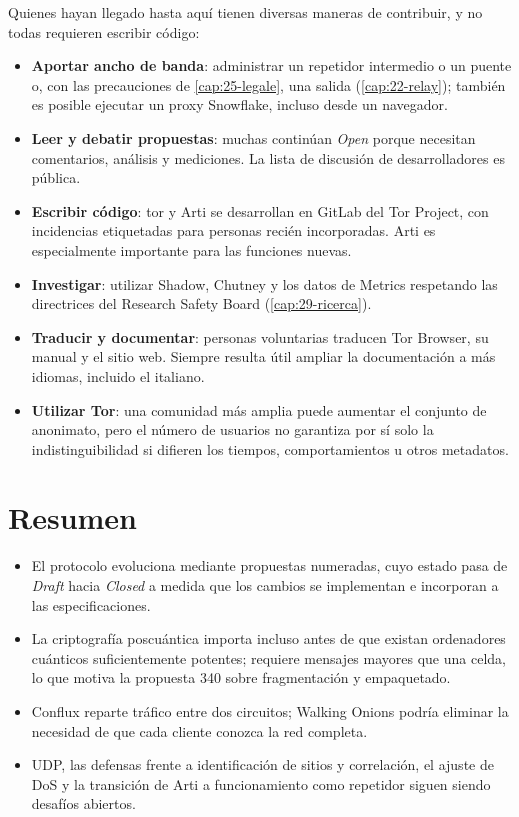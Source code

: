 Quienes hayan llegado hasta aquí tienen diversas maneras de contribuir, y no todas requieren escribir código:
\begin{itemize}
  \item \textbf{Aportar ancho de banda}: administrar un repetidor intermedio o un puente o, con las precauciones de \cref{cap:25-legale}, una salida (\cref{cap:22-relay}); también es posible ejecutar un proxy Snowflake, incluso desde un navegador.
  \item \textbf{Leer y debatir propuestas}: muchas continúan \emph{Open} porque necesitan comentarios, análisis y mediciones. La lista de discusión de desarrolladores es pública.
  \item \textbf{Escribir código}: tor y Arti se desarrollan en GitLab del Tor Project, con incidencias etiquetadas para personas recién incorporadas. Arti es especialmente importante para las funciones nuevas.
  \item \textbf{Investigar}: utilizar Shadow, Chutney y los datos de Metrics respetando las directrices del Research Safety Board (\cref{cap:29-ricerca}).
  \item \textbf{Traducir y documentar}: personas voluntarias traducen Tor Browser, su manual y el sitio web. Siempre resulta útil ampliar la documentación a más idiomas, incluido el italiano.
  \item \textbf{Utilizar Tor}: una comunidad más amplia puede aumentar el conjunto de anonimato, pero el número de usuarios no garantiza por sí solo la indistinguibilidad si difieren los tiempos, comportamientos u otros metadatos.
\end{itemize}

\section*{Resumen}
\begin{itemize}
  \item El protocolo evoluciona mediante propuestas numeradas, cuyo estado pasa de \emph{Draft} hacia \emph{Closed} a medida que los cambios se implementan e incorporan a las especificaciones.
  \item La criptografía poscuántica importa incluso antes de que existan ordenadores cuánticos suficientemente potentes; requiere mensajes mayores que una celda, lo que motiva la propuesta 340 sobre fragmentación y empaquetado.
  \item Conflux reparte tráfico entre dos circuitos; Walking Onions podría eliminar la necesidad de que cada cliente conozca la red completa.
  \item UDP, las defensas frente a identificación de sitios y correlación, el ajuste de DoS y la transición de Arti a funcionamiento como repetidor siguen siendo desafíos abiertos.
\end{itemize}

